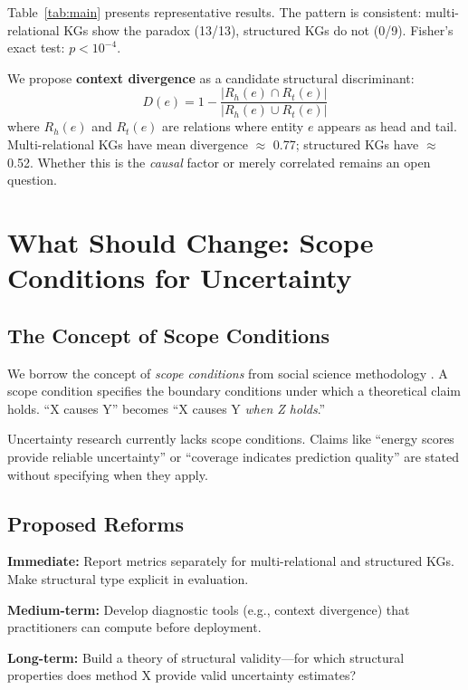 \documentclass{article}
\begin{document}

Table~\ref{tab:main} presents representative results. The pattern is consistent: multi-relational KGs show the paradox (13/13), structured KGs do not (0/9). Fisher's exact test: $p < 10^{-4}$.

We propose \textbf{context divergence} as a candidate structural discriminant:
\begin{equation}
D(e) = 1 - \frac{|R_h(e) \cap R_t(e)|}{|R_h(e) \cup R_t(e)|}
\end{equation}
where $R_h(e)$ and $R_t(e)$ are relations where entity $e$ appears as head and tail. Multi-relational KGs have mean divergence $\approx$ 0.77; structured KGs have $\approx$ 0.52. Whether this is the \emph{causal} factor or merely correlated remains an open question.

\section{What Should Change: Scope Conditions for Uncertainty}

\subsection{The Concept of Scope Conditions}

We borrow the concept of \emph{scope conditions} from social science methodology \citep{walker1967scope}. A scope condition specifies the boundary conditions under which a theoretical claim holds. ``X causes Y'' becomes ``X causes Y \emph{when Z holds}.''

Uncertainty research currently lacks scope conditions. Claims like ``energy scores provide reliable uncertainty'' or ``coverage indicates prediction quality'' are stated without specifying when they apply.

\subsection{Proposed Reforms}

\textbf{Immediate:} Report metrics separately for multi-relational and structured KGs. Make structural type explicit in evaluation.

\textbf{Medium-term:} Develop diagnostic tools (e.g., context divergence) that practitioners can compute before deployment.

\textbf{Long-term:} Build a theory of structural validity---for which structural properties does method X provide valid uncertainty estimates?
\end{document}
